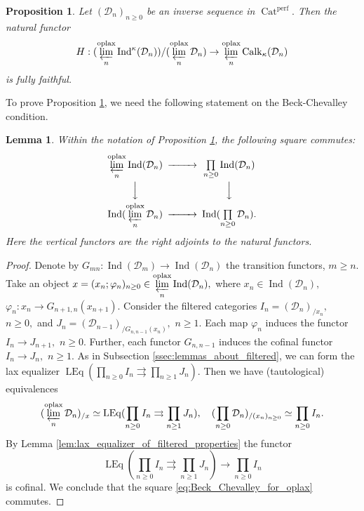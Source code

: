 \documentclass[11pt,leqno]{amsart}
\newtheorem{lemma}[theo]{Lemma}
\newtheorem{prop}[theo]{Proposition}
\numberwithin{equation}{section}
\newcommand{\prolim}[1][]{\mathop{\varprojlim}\limits_{#1}}
\newcommand{\prodd}[1][]{\mathop{\prod}\limits_{#1}}
\newcommand{\toto}{\rightrightarrows}
\newcommand{\oplax}{\operatorname{oplax}}
\newcommand{\Cat}{\operatorname{Cat}}
\newcommand{\cD}{{\mathcal D}}
\newcommand{\LEq}{\operatorname{LEq}}
\newcommand{\perf}{\operatorname{perf}}
\newcommand{\Ind}{\operatorname{Ind}}
\newcommand{\Calk}{\operatorname{Calk}}
\begin{document}
\begin{prop}\label{prop:quotients_of_oplax_limits} Let $(\cD_n)_{n\geq 0}$ be an inverse sequence in $\Cat^{\perf}.$ Then the natural functor
\begin{equation}\label{eq:key_fully_faithful_functor}
H:(\prolim[n]^{\oplax}\Ind^{\kappa}(\cD_n))/(\prolim[n]^{\oplax}\cD_n)\to \prolim[n]^{\oplax}\Calk_{\kappa}(\cD_n)	
\end{equation}
is fully faithful.
\end{prop}

To prove Proposition \ref{prop:quotients_of_oplax_limits}, we need the following statement on the Beck-Chevalley condition.

\begin{lemma}\label{lem:Beck_Chevalley_for_oplax}
Within the notation of Proposition \ref{prop:quotients_of_oplax_limits}, the following square commutes:
\begin{equation}\label{eq:Beck_Chevalley_for_oplax}
\begin{CD}
\prolim[n]^{\oplax}\Ind(\cD_n) @>>> \prodd[n\geq 0]\Ind(\cD_n)\\
@VVV @VVV\\
\Ind(\prolim[n]^{\oplax}\cD_n) @>>> \Ind(\prodd[n\geq 0]\cD_n).
\end{CD}
\end{equation}
Here the vertical functors are the right adjoints to the natural functors.
\end{lemma}

\begin{proof}
Denote by $G_{mn}:\Ind(\cD_m)\to\Ind(\cD_n)$ the transition functors, $m\geq n.$ Take an object $x=(x_n;\varphi_n)_{n\geq 0}\in \prolim[n]^{\oplax}\Ind(\cD_n),$ where $x_n\in\Ind(\cD_n),$ $\varphi_n:x_n\to G_{n+1,n}(x_{n+1}).$ Consider the filtered categories $I_n=(\cD_n)_{/ x_n},$ $n\geq 0,$ and $J_n=(\cD_{n-1})_{/G_{n,n-1}(x_n)},$ $n\geq 1.$ Each map $\varphi_n$ induces the functor $I_n\to J_{n+1},$ $n\geq 0.$ Further, each functor $G_{n,n-1}$ induces the cofinal functor $I_n\to J_n,$ $n\geq 1.$ As in Subsection \ref{ssec:lemmas_about_filtered}, we can form the lax equalizer $\LEq(\prodd[n\geq 0]I_n\toto \prodd[n\geq 1]J_n).$ Then we have (tautological) equivalences
\begin{equation*}
(\prolim[n]^{\oplax}\cD_n)_{/x}\simeq \LEq(\prodd[n\geq 0]I_n\toto \prodd[n\geq 1]J_n),\quad (\prodd[n\geq 0]\cD_n)_{/(x_n)_{n\geq 0}}\simeq \prodd[n\geq 0]I_n.
\end{equation*}
By Lemma \ref{lem:lax_equalizer_of_filtered_properties} the functor
\begin{equation*}
\LEq(\prodd[n\geq 0]I_n\toto \prodd[n\geq 1]J_n)\to \prodd[n\geq 0]I_n
\end{equation*}
is cofinal. We conclude that the square \eqref{eq:Beck_Chevalley_for_oplax} commutes.
\end{proof}
\end{document}
